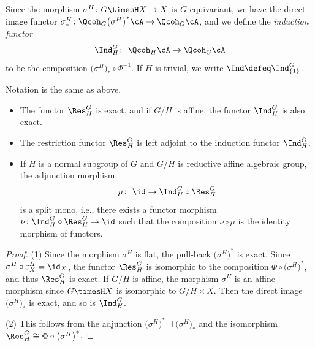 Since the morphism $\sigma^H\colon G\timesH X\to X$ is $G$-equivariant, we have the direct image functor $\sigma^H_*\colon\Qcoh_G\big(\sigma^{H}\big)^*\cA\to\Qcoh_G\cA$, and
we define the {\it induction functor}
\begin{gather*}
\Ind^G_H\colon\ \Qcoh_H \cA\to \Qcoh_G\cA
\end{gather*}
to be the composition $\big(\sigma^H\big)_*\circ \Phi^{-1}$. If $H$ is trivial, we write $\Ind\defeq\Ind^G_{\{1\}}$.
\begin{lem}\label{split mono} Notation is the same as above.
\begin{itemize}\itemsep=0pt
\item[$1.$] The functor $\Res^G_H$ is exact, and if $G/H$ is affine, the functor $\Ind^G_H$ is also exact.
\item[$2.$] The restriction functor $\Res^G_H$ is left adjoint to the induction functor $\Ind^G_H$.
\item[$3.$] If $H$ is a normal subgroup of $G$ and $G/H$ is reductive affine algebraic group, the adjunction morphism
\begin{gather*}
\mu\colon\ \id\to \Ind^G_H\circ \Res^G_H
\end{gather*}
is a split mono, i.e., there exists a functor morphism $\nu\colon\Ind^G_H\circ\Res^G_H\to \id$ such that the composition $\nu\circ\mu$ is the identity morphism of functors.

\end{itemize}
\begin{proof}
(1) Since the morphism $\sigma^H$ is flat, the pull-back $\big(\sigma^H\big)^*$ is exact. Since $\sigma^{H}\circ\varepsilon_X^H=\id_X$, the functor $\Res^G_H$ is isomorphic to the composition $\Phi\circ\big(\sigma^{H}\big)^*$, and thus $\Res^G_H$ is exact. If $G/H$ is affine, the morphism $\sigma^H$ is an affine morphism since $G\timesH X$ is isomorphic to $G/H\times X$. Then the direct image $\big(\sigma^{H}\big)_*$ is exact, and so is $\Ind^G_H$.

(2) This follows from the adjunction $\big(\sigma^{H}\big)^*\dashv\big(\sigma^{H}\big)_*$ and the isomorphism $\Res^G_H\cong \Phi\circ\big(\sigma^{H}\big)^*$.


\end{proof}
\end{lem}
